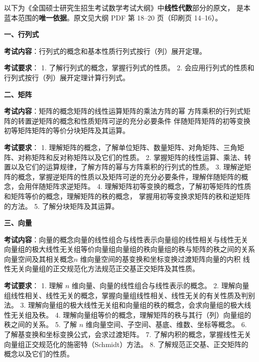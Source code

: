 
\begin{fnote}
以下为《全国硕士研究生招生考试数学考试大纲》中\textbf{线性代数}部分的原文，
是本蓝本范围的\textbf{唯一依据}。原文见大纲 PDF 第 18--20 页（印刷页 14--16）。
\end{fnote}

\begin{fnote}
\textbf{一、行列式}

\textbf{考试内容}：行列式的概念和基本性质\quad 行列式按行（列）展开定理。

\textbf{考试要求}：
1. 了解行列式的概念，掌握行列式的性质。
2. 会应用行列式的性质和行列式按行（列）展开定理计算行列式。
\end{fnote}

\begin{fnote}
\textbf{二、矩阵}

\textbf{考试内容}：矩阵的概念\quad 矩阵的线性运算\quad 矩阵的乘法\quad 方阵的幂\quad
方阵乘积的行列式\quad 矩阵的转置\quad 逆矩阵的概念和性质\quad 矩阵可逆的充分必要条件\quad
伴随矩阵\quad 矩阵的初等变换\quad 初等矩阵\quad 矩阵的等价\quad 分块矩阵及其运算。

\textbf{考试要求}：
1. 理解矩阵的概念，了解单位矩阵、数量矩阵、对角矩阵、三角矩阵、对称矩阵和反对称矩阵以及它们的性质。
2. 掌握矩阵的线性运算、乘法、转置以及它们的运算规律，了解方阵的幂与方阵乘积的行列式的性质。
3. 理解逆矩阵的概念，掌握逆矩阵的性质以及矩阵可逆的充分必要条件，理解伴随矩阵的概念，会用伴随矩阵求逆矩阵。
4. 理解矩阵初等变换的概念，了解初等矩阵的性质和矩阵等价的概念，理解矩阵的秩的概念，
   掌握用初等变换求矩阵的秩和逆矩阵的方法。
5. 了解分块矩阵及其运算。
\end{fnote}

\begin{fnote}
\textbf{三、向量}

\textbf{考试内容}：向量的概念\quad 向量的线性组合与线性表示\quad 向量组的线性相关与线性无关\quad
向量组的极大线性无关组\quad 等价向量组\quad 向量组的秩\quad 向量组的秩与矩阵的秩之间的关系\quad
向量空间及其相关概念\quad $n$ 维向量空间的基变换和坐标变换\quad 过渡矩阵\quad 向量的内积\quad
线性无关向量组的正交规范化方法\quad 规范正交基\quad 正交矩阵及其性质。

\textbf{考试要求}：
1. 理解 $n$ 维向量、向量的线性组合与线性表示的概念。
2. 理解向量组线性相关、线性无关的概念，掌握向量组线性相关、线性无关的有关性质及判别法。
3. 理解向量组的极大线性无关组和向量组的秩的概念，会求向量组的极大线性无关组及秩。
4. 理解向量组等价的概念，理解矩阵的秩与其行（列）向量组的秩之间的关系。
5. 了解 $n$ 维向量空间、子空间、基底、维数、坐标等概念。
6. 了解基变换和坐标变换公式，会求过渡矩阵。
7. 了解内积的概念，掌握线性无关向量组正交规范化的施密特（Schmidt）方法。
8. 了解规范正交基、正交矩阵的概念以及它们的性质。
\end{fnote}

